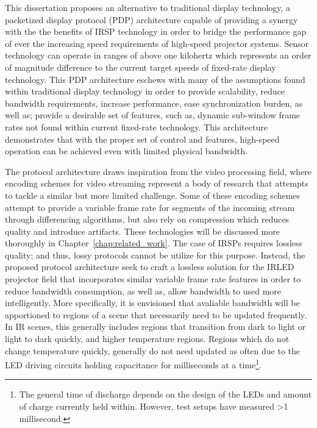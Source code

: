 This dissertation proposes an alternative to traditional display technology, a packetized display protocol (PDP) architecture capable of providing a synergy with the the benefits of IRSP technology in order to bridge the performance gap of ever the increasing speed requirements of high-speed projector systems. Sensor technology can operate in ranges of above one kilohertz which represents an order of magnitude difference to the current target speeds of fixed-rate display technology. This PDP architecture eschews with many of the assumptions found within traditional display technology in order to provide scalability, reduce bandwidth requirements, increase performance, ease synchronization burden, as well as; provide a desirable set of features, such as, dynamic sub-window frame rates not found within current fixed-rate technology. This architecture demonstrates that with the proper set of control and features, high-speed operation can be achieved even with limited physical bandwidth.

 The protocol architecture draws inspiration from the video processing field, where encoding schemes for video streaming represent a body of research that attempts to tackle a similar but more limited challenge\cite{BakarEtAl2017}. Some of these encoding schemes attempt to provide a variable frame rate for segments of the incoming stream through differencing algorithms, but also rely on compression\cite{CastilloEtAl2012} which reduces quality and introduce artifacts. These technologies will be discussed more thoroughly in Chapter~\ref{chap:related_work}. The case of IRSPs requires lossless quality; and thus, lossy protocols cannot be utilize for this purpose. Instead, the proposed protocol architecture seek to craft a lossless solution for the IRLED projector field that incorporates similar variable frame rate features in order to reduce bandwidth consumption, as well as, allow bandwidth to used more intelligently. More specifically, it is envisioned that avaliable bandwidth will be apportioned to regions of a scene that necessarily need to be updated frequently. In IR scenes, this generally includes regions that transition from dark to light or light to dark quickly, and higher temperature regions. Regions which do not change temperature quickly, generally do not need updated as often due to the LED driving circuits holding capacitance for milliseconds at a time\footnote{The general time of discharge depends on the design of the LEDs and amount of charge currently held within. However, test setups have measured \textgreater1 millisecond.}.

